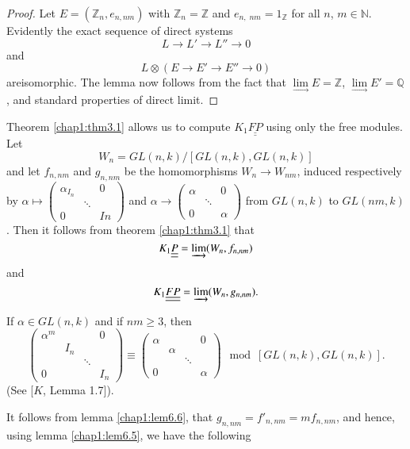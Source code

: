 \begin{proof}
Let $E= ( \mathbb{Z}_n , e_{n, nm})$ with $\mathbb{Z}_n = \mathbb{Z}$
and $e_{n, \; nm} = 1_{\mathbb{Z}}$ for all $n$, $m \in
\mathbb{N}$. Evidently the exact sequence of direct systems 
$$
L \to L' \to L'' \to 0 
$$ 
and 
$$
L \otimes (E \to E' \to E'' \to 0) 
$$
are\pageoriginale isomorphic. The lemma now follows from the fact that 
$\lim\limits_{\to} E = \mathbb{Z}$, $\lim\limits_{\to}E' =
\mathbb{Q}$, and standard properties of direct limit. 
\end{proof}

Theorem \ref{chap1:thm3.1} allows us to compute $K_1
\underline{\underline{FP}}$ using only the free modules. Let  
$$
W_n = GL (n,k) / [GL(n,k), GL(n,k)]
$$  
and let $f_{n,nm}$ and $g_{n,nm}$ be the homomorphisms $W_n \to
W_{nm}$, induced respectively by $\alpha \mapsto
\left(\begin{smallmatrix} \alpha_{I_n} && 0 \\ & \ddots \\ 0 &&
  In  \end{smallmatrix}\right)$ and $\alpha \to
\left(\begin{smallmatrix} \alpha & &0 \\ & \ddots  \\ 0 &
  &\alpha \end{smallmatrix}\right)$ from $GL(n,k)$ to $GL(nm,
k)$. Then it follows from theorem \ref{chap1:thm3.1} that  
$$
K_1 \underline{\underline{P}} = \varinjlim (W_n, f_{n,nm})
$$
and 
$$
K_1 \underline{\underline{FP}}= \varinjlim (W_n, g_{n,nm}).
$$

\begin{lemma}\label{chap1:lem6.6}%
If $\alpha \in GL(n,k)$ and if $nm \ge 3$, then  
$$
\begin{pmatrix}
 \alpha^m & & &  0 \\
 & I_n & &  \\ 
& & \ddots & \\
0 & &  &  I_n  
\end{pmatrix} 
\equiv 
\begin{pmatrix} 
\alpha & & & 0 \\ 
 & \alpha && \\ 
& & \ddots & \\
0 & & & \alpha  
\end{pmatrix} 
\mod [GL(n,k), GL(n,k)]. 
$$
(See [$K$, Lemma 1.7]).
\end{lemma}

It follows from lemma \ref{chap1:lem6.6}, that $g_{n, nm}= f'_{n, nm}=
mf_{n, nm}$, 
and hence, using lemma \ref{chap1:lem6.5}, we have the following 

